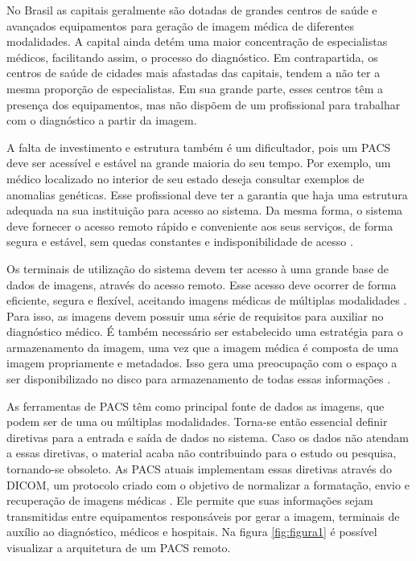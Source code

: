No Brasil as capitais geralmente são dotadas de grandes centros de saúde e avançados equipamentos para geração de imagem médica de diferentes modalidades.
A capital ainda detém uma maior concentração de especialistas médicos, facilitando assim, o processo do diagnóstico.
Em contrapartida, os centros de saúde de cidades mais afastadas das capitais, tendem a não ter a mesma proporção de especialistas.
Em sua grande parte, esses centros têm a presença dos equipamentos, mas não dispõem de um profissional para trabalhar com o diagnóstico a partir da imagem.

A falta de investimento e estrutura também é um dificultador, pois um PACS deve ser acessível e estável na grande maioria do seu tempo.
Por exemplo, um médico localizado no interior de seu estado deseja consultar exemplos de anomalias genéticas.
Esse profissional deve ter a garantia que haja uma estrutura adequada na sua instituição para acesso ao sistema.
Da mesma forma, o sistema deve fornecer o acesso remoto rápido e conveniente aos seus serviços, de forma segura e estável, sem quedas constantes e indisponibilidade de acesso \cite{REF19}.

Os terminais de utilização do sistema devem ter acesso à uma grande base de dados de imagens, através do acesso remoto.
Esse acesso deve ocorrer de forma eficiente, segura e flexível, aceitando imagens médicas de múltiplas modalidades \cite{REF18}.
Para isso, as imagens devem possuir uma série de requisitos para auxiliar no diagnóstico médico.
É também necessário ser estabelecido uma estratégia para o armazenamento da imagem, uma vez que a imagem médica é composta de uma imagem propriamente e metadados.
Isso gera uma preocupação com o espaço a ser disponibilizado no disco para armazenamento de todas essas informações \cite{REF10}.

As ferramentas de PACS têm como principal fonte de dados as imagens, que podem ser de uma ou múltiplas modalidades.
Torna-se então essencial definir diretivas para a entrada e saída de dados no sistema.
Caso os dados não atendam a essas diretivas, o material acaba não contribuindo para o estudo ou pesquisa, tornando-se obsoleto.
As PACS atuais implementam essas diretivas através do DICOM, um protocolo criado com o objetivo de normalizar a formatação, envio e recuperação de imagens médicas \cite{REF20}.
Ele permite que suas informações sejam transmitidas entre equipamentos responsáveis por gerar a imagem, terminais de auxílio ao diagnóstico, médicos e hospitais. Na figura \ref{fig:figura1} é possível visualizar a arquitetura de um PACS remoto.


